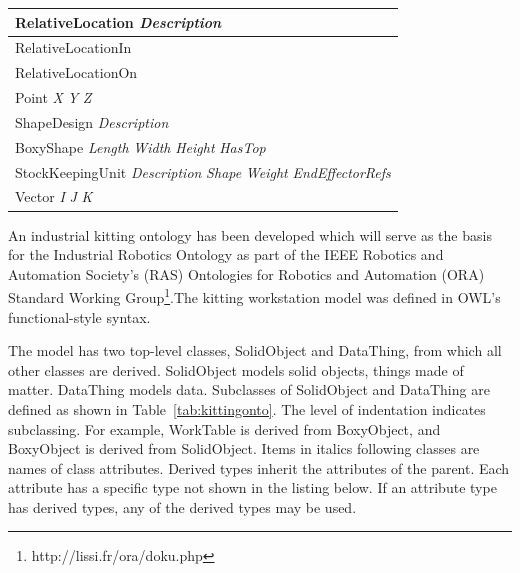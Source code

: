 \documentclass[preprint,12pt]{elsarticle}
\newcommand{\class}[1] {\textsf{#1}}
\begin{document}
\begin{table}[!h!t]
{\begin{tabular}{l}
\\\midrule
\hspace{10 mm}\class{RelativeLocation} \textit{Description}
\\\midrule
\hspace{15 mm}\class{RelativeLocationIn}
\\\midrule
\hspace{15 mm}\class{RelativeLocationOn}
\\\midrule
\hspace{5 mm}\class{Point} \textit{X} \textit{Y} \textit{Z}
\\\midrule
\hspace{5 mm}\class{ShapeDesign} \textit{Description}
\\\midrule
\hspace{10 mm}\class{BoxyShape} \textit{Length} \textit{Width} \textit{Height} \textit{HasTop}
\\\midrule
\hspace{5 mm}\class{StockKeepingUnit} \textit{Description} \textit{Shape} \textit{Weight} \textit{EndEffectorRefs}
\\\midrule
\hspace{5 mm}\class{Vector} \textit{I} \textit{J} \textit{K}
\\\bottomrule
\end{tabular}
}
\end{table}

An industrial kitting ontology has been developed which will serve as the basis for the Industrial Robotics Ontology as part of the IEEE Robotics and Automation Society's (RAS) Ontologies for Robotics and Automation (ORA) Standard Working Group\footnote{http://lissi.fr/ora/doku.php}.The kitting workstation model was defined in OWL's functional-style syntax.

The model has two top-level classes, \textsf{SolidObject} and \class{DataThing}, from which all other classes are derived. \class{SolidObject} models solid objects, things made of matter. \class{DataThing} models data. Subclasses of \class{SolidObject} and \class{DataThing} are defined as shown in Table~\ref{tab:kittingonto}. The level of indentation indicates subclassing. For example, \class{WorkTable} is derived from \class{BoxyObject}, and \class{BoxyObject} is derived from \class{SolidObject}. Items in italics following classes are names of class attributes. Derived types inherit the attributes of the parent. Each attribute has a specific type not shown in the listing below. If an attribute type has derived types, any of the derived types may be used.
\end{document}

